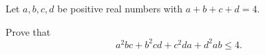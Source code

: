 Let $ a,b,c,d$ be positive real numbers with $ a+b+c+d = 4$.

Prove that\[ a^{2}bc+b^{2}cd+c^{2}da+d^{2}ab\leq 4.\]